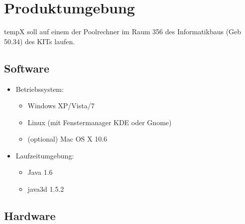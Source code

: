 \section{Produktumgebung}

\label{sec:produktumgebung}

\gls{tempX} soll auf einem der Poolrechner im Raum 356 des Informatikbaus (Geb 50.34) des KITs laufen.

\subsection{Software}

\label{subsec:software}

	\begin{itemize}
		
		\item Betriebssystem: 

			\begin{itemize}

				\item Windows XP/Vista/7

				\item Linux (mit Fenstermanager KDE oder Gnome)

				\item (optional) Mac OS X 10.6

			\end{itemize}
	
		\item Laufzeitumgebung:
		
			\begin{itemize}
				
				\item Java 1.6
				
				\item \gls{java3d} 1.5.2
				
			\end{itemize}
		
	\end{itemize}
	
\subsection{Hardware}

